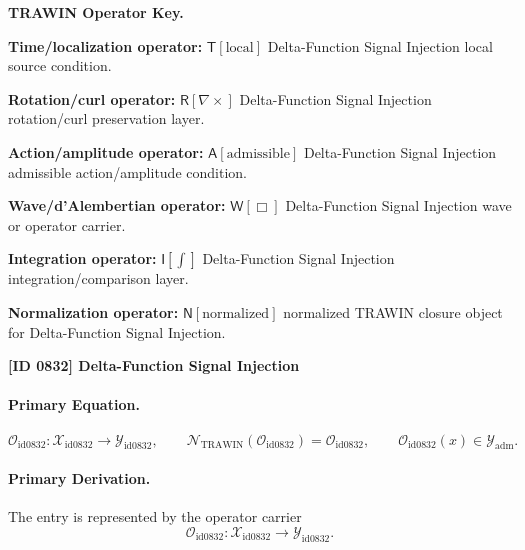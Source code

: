 \par\vspace{0.45\baselineskip}
\noindent\begin{minipage}[t]{\linewidth}
\begingroup
\small
\raggedright
\textbf{TRAWIN Operator Key.}\par
\noindent\textbf{Time/localization operator:} $\mathsf{T}\!\left[\mathrm{local}\right]$ Delta-Function Signal Injection local source condition.\par
\noindent\textbf{Rotation/curl operator:} $\mathsf{R}\!\left[\nabla\times\right]$ Delta-Function Signal Injection rotation/curl preservation layer.\par
\noindent\textbf{Action/amplitude operator:} $\mathsf{A}\!\left[\mathrm{admissible}\right]$ Delta-Function Signal Injection admissible action/amplitude condition.\par
\noindent\textbf{Wave/d'Alembertian operator:} $\mathsf{W}\!\left[\Box\right]$ Delta-Function Signal Injection wave or operator carrier.\par
\noindent\textbf{Integration operator:} $\mathsf{I}\!\left[\int\right]$ Delta-Function Signal Injection integration/comparison layer.\par
\noindent\textbf{Normalization operator:} $\mathsf{N}\!\left[\mathrm{normalized}\right]$ normalized TRAWIN closure object for Delta-Function Signal Injection.\par
\endgroup
\end{minipage}

\clearpage
\noindent\textbf{[ID 0832] Delta-Function Signal Injection}\par
\vspace{0.35em}
\paragraph{Primary Equation.}
\[
\mathcal{O}_{\mathrm{id0832}}:\mathcal{X}_{\mathrm{id0832}}\longrightarrow \mathcal{Y}_{\mathrm{id0832}},\qquad
\mathcal{N}_{\mathrm{TRAWIN}}(\mathcal{O}_{\mathrm{id0832}})=\mathcal{O}_{\mathrm{id0832}},\qquad
\mathcal{O}_{\mathrm{id0832}}(x)\in\mathcal{Y}_{\mathrm{adm}}.
\]

\paragraph{Primary Derivation.} The entry is represented by the operator carrier\[
\mathcal{O}_{\mathrm{id0832}}:\mathcal{X}_{\mathrm{id0832}}\longrightarrow \mathcal{Y}_{\mathrm{id0832}}.
\]

